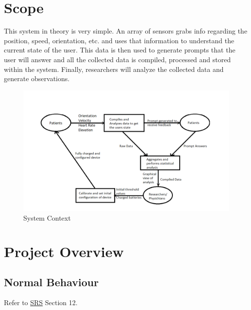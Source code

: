 \documentclass[12pt, titlepage]{article}
\begin{document}
\section{Scope}

This system in theory is very simple. An array of sensors grabs info regarding the position, speed, orientation, etc. and uses that information to understand the current state of the user. This data is then used to generate prompts that the user will answer and all the collected data is compiled, processed and stored within the system. Finally, researchers will analyze the collected data and generate observations. \\

\begin{figure}[H]

\begin{center}
 \includegraphics[width=.95\textwidth]{System Context Diagram}
\caption{System Context}
\label{Fig_SystemContext} 
\end{center}
\end{figure}


\section{Project Overview}

\subsection{Normal Behaviour}

Refer to \href{https://github.com/zakerl/Capstone_Project/blob/main/docs/SRS/SRS.pdf}{SRS} Section 12.
\end{document}
